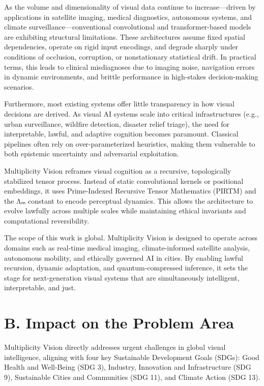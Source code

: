 \documentclass[12pt]{article}
\theoremstyle{plain}
\begin{document}
As the volume and dimensionality of visual data continue to increase—driven by applications in satellite imaging, medical diagnostics, autonomous systems, and climate surveillance—conventional convolutional and transformer-based models are exhibiting structural limitations. These architectures assume fixed spatial dependencies, operate on rigid input encodings, and degrade sharply under conditions of occlusion, corruption, or nonstationary statistical drift. In practical terms, this leads to clinical misdiagnoses due to imaging noise, navigation errors in dynamic environments, and brittle performance in high-stakes decision-making scenarios.

Furthermore, most existing systems offer little transparency in how visual decisions are derived. As visual AI systems scale into critical infrastructures (e.g., urban surveillance, wildfire detection, disaster relief triage), the need for interpretable, lawful, and adaptive cognition becomes paramount. Classical pipelines often rely on over-parameterized heuristics, making them vulnerable to both epistemic uncertainty and adversarial exploitation.

Multiplicity Vision reframes visual cognition as a recursive, topologically stabilized tensor process. Instead of static convolutional kernels or positional embeddings, it uses Prime-Indexed Recursive Tensor Mathematics (PIRTM) and the Λₘ constant to encode perceptual dynamics. This allows the architecture to evolve lawfully across multiple scales while maintaining ethical invariants and computational reversibility.

The scope of this work is global. Multiplicity Vision is designed to operate across domains such as real-time medical imaging, climate-informed satellite analysis, autonomous mobility, and ethically governed AI in cities. By enabling lawful recursion, dynamic adaptation, and quantum-compressed inference, it sets the stage for next-generation visual systems that are simultaneously intelligent, interpretable, and just.

\section*{B. Impact on the Problem Area}

Multiplicity Vision directly addresses urgent challenges in global visual intelligence, aligning with four key Sustainable Development Goals (SDGs): Good Health and Well-Being (SDG 3), Industry, Innovation and Infrastructure (SDG 9), Sustainable Cities and Communities (SDG 11), and Climate Action (SDG 13).
\end{document}

